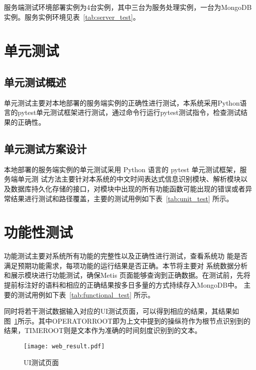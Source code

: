 服务端测试环境部署实例为4台实例，其中三台为服务处理实例，一台为MongoDB实例。服务实例环境见表~\ref{tab:server_test}。



\section{单元测试}

\subsection{单元测试概述}

单元测试主要对本地部署的服务端实例的正确性进行测试，本系统采用Python语言的pytest单元测试框架进行测试，通过命令行运行pytest测试指令，检查测试结果的正确性。

\subsection{单元测试方案设计}

本地部署的服务端实例的单元测试采用 Python 语言的 pytest 单元测试框架，服务端单元测
试方法主要针对本系统的中文时间表达式信息识别模块、解析模块以及数据库持久化存储的接口，对模块中出现的所有功能函数可能出现的错误或者异常结果进行测试和路径覆盖，主要的测试用例如下表~\ref{tab:unit_test} 所示。

\section{功能性测试}

功能测试主要对系统所有功能的完整性以及正确性进行测试，查看系统功
能是否满足预期功能需求，每项功能的运行结果是否正确。本节将主要对
系统数据分析和展示模块进行功能测试，确保Metis
页面能够查询到正确数据。在测试前，先将提前标注好的语料和相应的正确结果按多日多量的方式持续存入MongoDB中。
主要的测试用例如下表~\ref{tab:functional_test} 所示。

同时将若干测试数据输入对应的UI测试页面，可以得到相应的结果，其结果如图~\ref{fig:web_result}所示。其中OPERATORROOT即为上文中提到的操纵符作为根节点识别到的结果，TIMEROOT则是文本作为准确的时间刻度识别到的文本。

\begin{figure}[h]
    \centering
    \texttt{[image: web\_result.pdf]}
    \caption{UI测试页面}
    \label{fig:web_result}
\end{figure}

